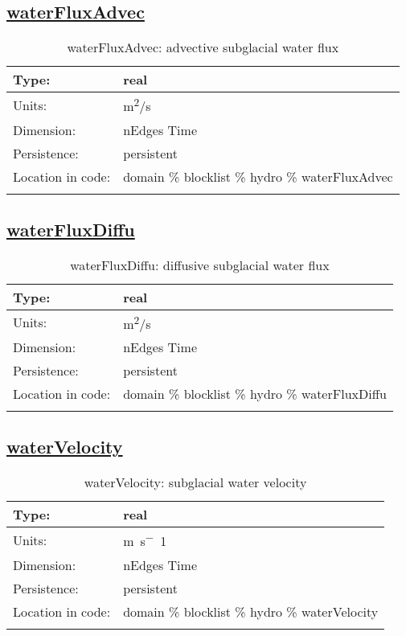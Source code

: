 \subsection[waterFluxAdvec]{\hyperref[sec:var_tab_hydro]{waterFluxAdvec}}
\label{subsec:var_sec_hydro_waterFluxAdvec}
\begin{center}
\begin{longtable}{| p{2.0in} | p{4.0in} |}
        \hline 
        Type: & real \\
        \hline 
        Units: & \si{m^2/s} \\
        \hline 
        Dimension: & nEdges Time \\
        \hline 
        Persistence: & persistent \\
        \hline 
         Location in code: & domain \% blocklist \% hydro \% waterFluxAdvec \\
         \hline 
    \caption{waterFluxAdvec: advective subglacial water flux}
\end{longtable}
\end{center}
\subsection[waterFluxDiffu]{\hyperref[sec:var_tab_hydro]{waterFluxDiffu}}
\label{subsec:var_sec_hydro_waterFluxDiffu}
\begin{center}
\begin{longtable}{| p{2.0in} | p{4.0in} |}
        \hline 
        Type: & real \\
        \hline 
        Units: & \si{m^2/s} \\
        \hline 
        Dimension: & nEdges Time \\
        \hline 
        Persistence: & persistent \\
        \hline 
         Location in code: & domain \% blocklist \% hydro \% waterFluxDiffu \\
         \hline 
    \caption{waterFluxDiffu: diffusive subglacial water flux}
\end{longtable}
\end{center}
\subsection[waterVelocity]{\hyperref[sec:var_tab_hydro]{waterVelocity}}
\label{subsec:var_sec_hydro_waterVelocity}
\begin{center}
\begin{longtable}{| p{2.0in} | p{4.0in} |}
        \hline 
        Type: & real \\
        \hline 
        Units: & \si{m.s^-1} \\
        \hline 
        Dimension: & nEdges Time \\
        \hline 
        Persistence: & persistent \\
        \hline 
         Location in code: & domain \% blocklist \% hydro \% waterVelocity \\
         \hline 
    \caption{waterVelocity: subglacial water velocity}
\end{longtable}
\end{center}
